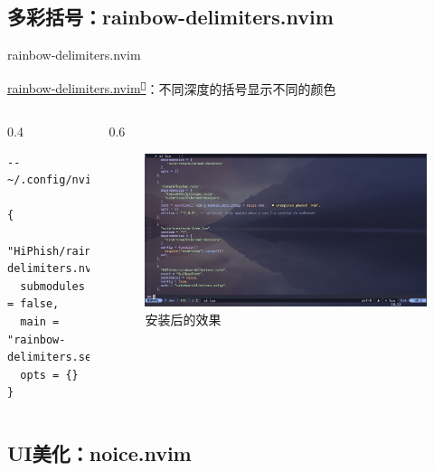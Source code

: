 \documentclass[aspectratio=169]{ctexbeamer}
\newcommand{\nerd}[1]{\texttt{#1}}
\newcommand{\link}[3][]{\href{#3}{#2\textsuperscript{\nerd{}}}}
\begin{document}
  \subsection{多彩括号：rainbow-delimiters.nvim}
    \begin{frame}[fragile]{rainbow-delimiters.nvim}

      \link{rainbow-delimiters.nvim}{https://github.com/HiPhish/rainbow-delimiters.nvim}：不同深度的括号显示不同的颜色

      \begin{columns}
        \begin{column}{0.4\linewidth}
          \begin{lstlisting}[basicstyle=\tiny\ttfamily]
-- ~/.config/nvim/lua/plugins/ui.lua

{
  "HiPhish/rainbow-delimiters.nvim",
  submodules = false,
  main = "rainbow-delimiters.setup",
  opts = {}
}
          \end{lstlisting}
        \end{column}

        \begin{column}{0.6\linewidth}

          \begin{figure}[H]
            \centering
            \includegraphics[width=\linewidth]{./Figures/Rainbow_Finish.jpg}
            \caption{安装后的效果}%
          \end{figure}

        \end{column}
      \end{columns}

    \end{frame}

  \subsection{UI美化：noice.nvim}
\end{document}
